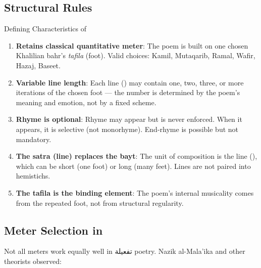 \subsection{Structural Rules}

\begin{rulebox}{Defining Characteristics of }
\begin{enumerate}
  \item \textbf{Retains classical quantitative meter}: The poem is built on one chosen Khalilian bahr's \textit{tafila} (foot). Valid choices: Kamil, Mutaqarib, Ramal, Wafir, Hazaj, Baseet.
  \item \textbf{Variable line length}: Each line () may contain one, two, three, or more iterations of the chosen foot — the number is determined by the poem's meaning and emotion, not by a fixed scheme.
  \item \textbf{Rhyme is optional}: Rhyme may appear but is never enforced. When it appears, it is selective (not monorhyme). End-rhyme is possible but not mandatory.
  \item \textbf{The satra (line) replaces the bayt}: The unit of composition is the line (), which can be short (one foot) or long (many feet). Lines are not paired into hemistichs.
  \item \textbf{The tafila is the binding element}: The poem's internal musicality comes from the repeated foot, not from structural regularity.
\end{enumerate}
\end{rulebox}

\subsection{Meter Selection in }

Not all meters work equally well in تفعيلة poetry. Nazik al-Mala'ika and other theorists observed:

